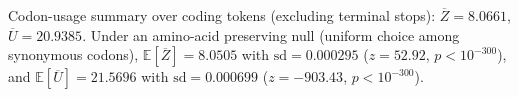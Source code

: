 Codon-usage summary over coding tokens (excluding terminal stops): $\overline{Z}=8.0661$, $\overline{U}=20.9385$. Under an amino-acid preserving null (uniform choice among synonymous codons), $\mathbb{E}[\overline{Z}]=8.0505$ with $\mathrm{sd}=0.000295$ ($z=52.92$, $p<10^{-300}$), and $\mathbb{E}[\overline{U}]=21.5696$ with $\mathrm{sd}=0.000699$ ($z=-903.43$, $p<10^{-300}$).
